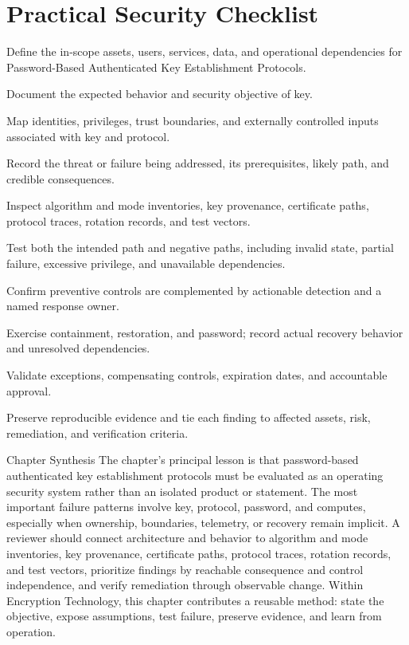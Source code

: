 \documentclass[11pt,letterpaper]{article}
\begin{document}
\section*{Practical Security Checklist}
\begin{CornellChecklist}
\item Define the in-scope assets, users, services, data, and operational dependencies for Password-Based Authenticated Key Establishment Protocols.
\item Document the expected behavior and security objective of key.
\item Map identities, privileges, trust boundaries, and externally controlled inputs associated with key and protocol.
\item Record the threat or failure being addressed, its prerequisites, likely path, and credible consequences.
\item Inspect algorithm and mode inventories, key provenance, certificate paths, protocol traces, rotation records, and test vectors.
\item Test both the intended path and negative paths, including invalid state, partial failure, excessive privilege, and unavailable dependencies.
\item Confirm preventive controls are complemented by actionable detection and a named response owner.
\item Exercise containment, restoration, and password; record actual recovery behavior and unresolved dependencies.
\item Validate exceptions, compensating controls, expiration dates, and accountable approval.
\item Preserve reproducible evidence and tie each finding to affected assets, risk, remediation, and verification criteria.
\end{CornellChecklist}
\begin{CornellSummaryBox}{Chapter Synthesis}
The chapter's principal lesson is that password-based authenticated key establishment protocols must be evaluated as an operating security system rather than an isolated product or statement. The most important failure patterns involve key, protocol, password, and computes, especially when ownership, boundaries, telemetry, or recovery remain implicit. A reviewer should connect architecture and behavior to algorithm and mode inventories, key provenance, certificate paths, protocol traces, rotation records, and test vectors, prioritize findings by reachable consequence and control independence, and verify remediation through observable change. Within Encryption Technology, this chapter contributes a reusable method: state the objective, expose assumptions, test failure, preserve evidence, and learn from operation.
\end{CornellSummaryBox}
\end{document}
